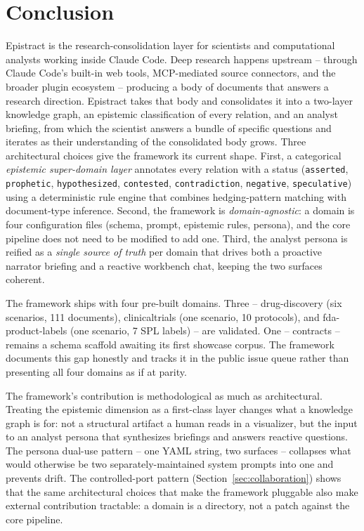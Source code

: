 \section{Conclusion}
\label{sec:conclusion}

Epistract is the research-consolidation layer for scientists and computational analysts working inside Claude Code. Deep research happens upstream -- through Claude Code's built-in web tools, MCP-mediated source connectors, and the broader plugin ecosystem -- producing a body of documents that answers a research direction. Epistract takes that body and consolidates it into a two-layer knowledge graph, an epistemic classification of every relation, and an analyst briefing, from which the scientist answers a bundle of specific questions and iterates as their understanding of the consolidated body grows. Three architectural choices give the framework its current shape. First, a categorical \emph{epistemic super-domain layer} annotates every relation with a status (\texttt{asserted}, \texttt{prophetic}, \texttt{hypothesized}, \texttt{contested}, \texttt{contradiction}, \texttt{negative}, \texttt{speculative}) using a deterministic rule engine that combines hedging-pattern matching with document-type inference. Second, the framework is \emph{domain-agnostic}: a domain is four configuration files (schema, prompt, epistemic rules, persona), and the core pipeline does not need to be modified to add one. Third, the analyst persona is reified as a \emph{single source of truth} per domain that drives both a proactive narrator briefing and a reactive workbench chat, keeping the two surfaces coherent.

The framework ships with four pre-built domains. Three -- drug-discovery (six scenarios, 111 documents), clinicaltrials (one scenario, 10 protocols), and fda-product-labels (one scenario, 7 SPL labels) -- are validated. One -- contracts -- remains a schema scaffold awaiting its first showcase corpus. The framework documents this gap honestly and tracks it in the public issue queue rather than presenting all four domains as if at parity.

The framework's contribution is methodological as much as architectural. Treating the epistemic dimension as a first-class layer changes what a knowledge graph is for: not a structural artifact a human reads in a visualizer, but the input to an analyst persona that synthesizes briefings and answers reactive questions. The persona dual-use pattern -- one YAML string, two surfaces -- collapses what would otherwise be two separately-maintained system prompts into one and prevents drift. The controlled-port pattern (Section~\ref{sec:collaboration}) shows that the same architectural choices that make the framework pluggable also make external contribution tractable: a domain is a directory, not a patch against the core pipeline.

